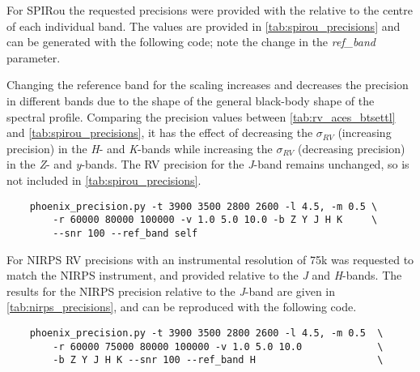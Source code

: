 For {SPIRou} the requested precisions were provided with the \snr{} relative to the centre of each individual band.
The values are provided in \cref{tab:spirou_precisions} and can be generated with the following code; note the change in the \emph{ref\_band} parameter.


Changing the reference band for the \snr{} scaling increases and decreases the precision in different bands due to the shape of the general black-body shape of the spectral profile.
Comparing the precision values between \cref{tab:rv_aces_btsettl} and \cref{tab:spirou_precisions}, it has the effect of decreasing the $\sigma_{RV}$ (increasing precision) in the \emph{H}- and \emph{K}-bands while increasing the $\sigma_{RV}$ (decreasing precision) in the \emph{Z}- and \emph{y}-bands.
The RV precision for the \emph{J}-band remains unchanged, so is not included in \cref{tab:spirou_precisions}.


\begin{lstlisting}
    phoenix_precision.py -t 3900 3500 2800 2600 -l 4.5, -m 0.5 \
        -r 60000 80000 100000 -v 1.0 5.0 10.0 -b Z Y J H K     \
        --snr 100 --ref_band self
\end{lstlisting}


For {NIRPS} RV precisions with an instrumental resolution of 75k was requested to match the {NIRPS} instrument, and provided relative to the \emph{J} and \emph{H}-bands.
The results for the {NIRPS} precision relative to the \emph{J}-band are given in \cref{tab:nirps_precisions}, and can be reproduced with the following code.

\begin{lstlisting}
    phoenix_precision.py -t 3900 3500 2800 2600 -l 4.5, -m 0.5  \
        -r 60000 75000 80000 100000 -v 1.0 5.0 10.0             \
        -b Z Y J H K --snr 100 --ref_band H                     \
\end{lstlisting}








